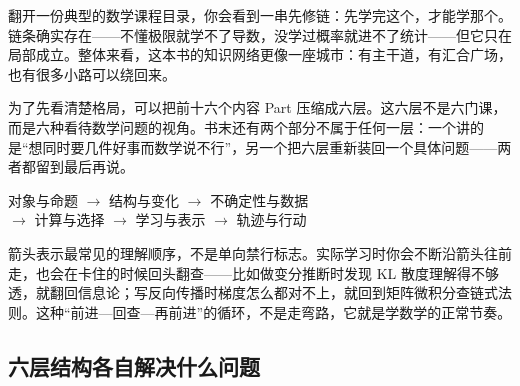 翻开一份典型的数学课程目录，你会看到一串先修链：先学完这个，才能学那个。链条确实存在——不懂极限就学不了导数，没学过概率就进不了统计——但它只在局部成立。整体来看，这本书的知识网络更像一座城市：有主干道，有汇合广场，也有很多小路可以绕回来。

为了先看清楚格局，可以把前十六个内容 Part 压缩成六层。这六层不是六门课，而是六种看待数学问题的视角。书末还有两个部分不属于任何一层：一个讲的是``想同时要几件好事而数学说不行''，另一个把六层重新装回一个具体问题——两者都留到最后再说。

\begin{center}
对象与命题 \(\longrightarrow\) 结构与变化 \(\longrightarrow\) 不确定性与数据\\
\(\longrightarrow\) 计算与选择 \(\longrightarrow\) 学习与表示 \(\longrightarrow\) 轨迹与行动
\end{center}

箭头表示最常见的理解顺序，不是单向禁行标志。实际学习时你会不断沿箭头往前走，也会在卡住的时候回头翻查——比如做变分推断时发现 KL 散度理解得不够透，就翻回信息论；写反向传播时梯度怎么都对不上，就回到矩阵微积分查链式法则。这种``前进—回查—再前进''的循环，不是走弯路，它就是学数学的正常节奏。

\subsection{六层结构各自解决什么问题}

